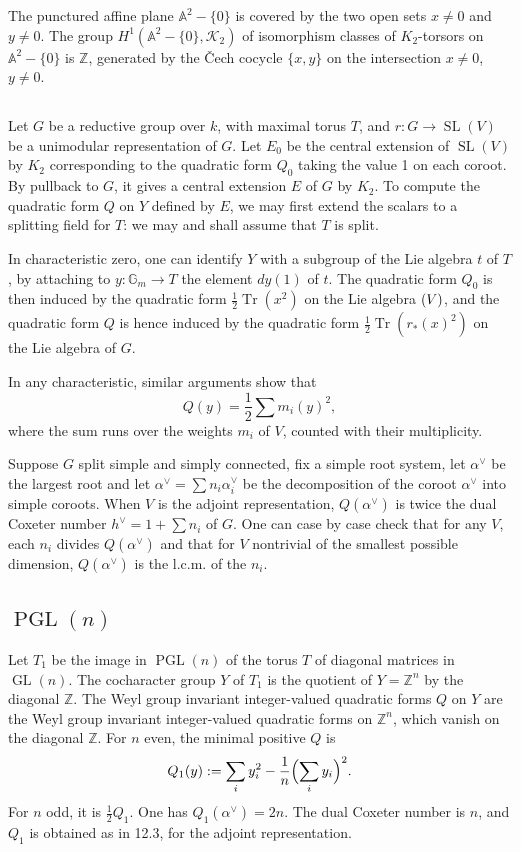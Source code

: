 \documentclass[11pt,a4paper]{article}
\theoremstyle{plain}
\theoremstyle{definition}
\DeclareMathOperator{\Tr}{Tr}
\let\sl\relax
\DeclareMathOperator{\sl}{sl}
\newcommand{\cK}{\mathcal{K}}
\newcommand{\bA}{\mathbb{A}}
\newcommand{\bZ}{\mathbb{Z}}
\newcommand{\Gm}{{\mathbb{G}_m}}
\DeclareMathOperator{\GL}{GL}
\DeclareMathOperator{\SL}{SL}
\DeclareMathOperator{\PGL}{PGL}
\begin{document}
The punctured affine plane $\bA^2 - \{0\}$ is covered by the two open sets $x \neq 0$ and $y \neq 0$. The group $H^1(\bA^2 - \{0\}, \cK_2)$ of isomorphism classes of $K_2$-torsors on $\bA^2 - \{0\}$ is $\bZ$, generated by the \v Cech cocycle $\{x,y\}$ on the intersection $x \neq 0$, $y \neq 0$.

\subsection{}
Let $G$ be a reductive group over $k$, with maximal torus $T$, and $r: G \to \SL(V)$ be a unimodular representation of $G$. Let $E_0$ be the central extension of $\SL(V)$ by $K_2$ corresponding to the quadratic form $Q_0$ taking the value 1 on each coroot. By pullback to $G$, it gives a central extension $E$ of $G$ by $K_2$. To compute the quadratic form $Q$ on $Y$ defined by $E$, we may first extend the scalars to a splitting field for $T$: we may and shall assume that $T$ is split.

In characteristic zero, one can identify $Y$ with a subgroup of the Lie algebra $t$ of $T$, by attaching to $y: \Gm \to T$ the element $dy(1)$ of $t$. The quadratic form $Q_0$ is then induced by the quadratic form $\frac{1}{2}\Tr(x^2)$ on the Lie algebra $\sl(V)$, and the quadratic form $Q$ is hence induced by the quadratic form $\frac{1}{2}\Tr(r_*(x)^2)$ on the Lie algebra of $G$.

In any characteristic, similar arguments show that
\[Q(y) = \frac{1}{2} \sum m_i(y)^2,\]
where the sum runs over the weights $m_i$ of $V$, counted with their multiplicity.

Suppose $G$ split simple and simply connected, fix a simple root system, let $\alpha^\vee$ be the largest root and let $\alpha^\vee = \sum n_i \alpha_i^\vee$ be the decomposition of the coroot $\alpha^\vee$ into simple coroots. When $V$ is the adjoint representation, $Q(\alpha^\vee)$ is twice the dual Coxeter number $h^\vee = 1 + \sum n_i$ of $G$. One can case by case check that for any $V$, each $n_i$ divides $Q(\alpha^\vee)$ and that for $V$ nontrivial of the smallest possible dimension, $Q(\alpha^\vee)$ is the l.c.m. of the $n_i$.

\subsection{$\PGL(n)$}
Let $T_1$ be the image in $\PGL(n)$ of the torus $T$ of diagonal matrices in $\GL(n)$. The cocharacter group $Y$ of $T_1$ is the quotient of $Y = \bZ^n$ by the diagonal $\bZ$. The Weyl group invariant integer-valued quadratic forms $Q$ on $Y$ are the Weyl group invariant integer-valued quadratic forms on $\bZ^n$, which vanish on the diagonal $\bZ$. For $n$ even, the minimal positive $Q$ is
\[Q_1(y) := \sum_i y_i^2 - \frac{1}{n} \Bigl(\sum_i y_i\Bigr)^2.\]
For $n$ odd, it is $\frac{1}{2}Q_1$. One has $Q_1(\alpha^\vee) = 2n$. The dual Coxeter number is $n$, and $Q_1$ is obtained as in 12.3, for the adjoint representation.
\end{document}
